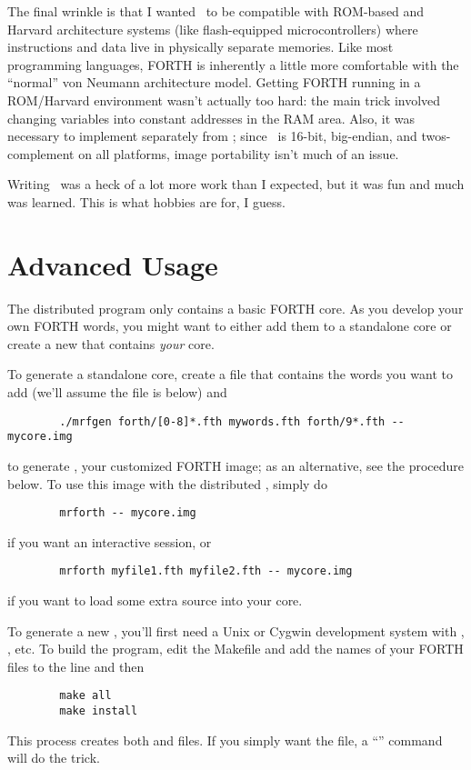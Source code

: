 \documentclass{article}
\begin{document}
The final wrinkle is that I wanted \M\ to be compatible with
ROM-based and Harvard architecture systems (like flash-equipped
microcontrollers) where instructions and data live in physically
separate memories.  Like most programming languages, FORTH is
inherently a little more comfortable with the ``normal'' von Neumann
architecture model.  Getting FORTH running in a ROM/Harvard
environment wasn't actually too hard: the main trick involved
changing variables into constant addresses in the RAM area. Also, it
was necessary to implement  separately from ;
since \M\ is 16-bit, big-endian, and twos-complement on all
platforms, image portability isn't much of an issue.

Writing \M\ was a heck of a lot more work than I expected, but it was
fun and much was learned. This is what hobbies are for, I guess.

\section*{Advanced Usage}

The distributed  program only contains a basic
FORTH core. As you develop your own FORTH words, you might
want to either add them to a standalone core or create a new
 that contains \textit{your} core.

To generate a standalone core, create a file that contains the words
you want to add (we'll assume the file is  below) and
\begin{verbatim}
        ./mrfgen forth/[0-8]*.fth mywords.fth forth/9*.fth -- mycore.img
\end{verbatim}
to generate , your customized FORTH image; as an
alternative, see the procedure below. To use this image with the
distributed , simply do
\begin{verbatim}
        mrforth -- mycore.img
\end{verbatim}
if you want an interactive session, or
\begin{verbatim}
        mrforth myfile1.fth myfile2.fth -- mycore.img
\end{verbatim}
if you want to load some extra source into your core.

To generate a new , you'll first need a Unix or Cygwin
development system with , , etc. To build the
 program, edit the Makefile and add the names of your
FORTH files to the  line and then
\begin{verbatim}
        make all
        make install
\end{verbatim}
This process creates both  and 
files. If you simply want the  file, a ``'' command will do the trick.
\end{document}
